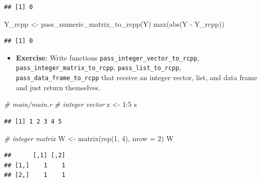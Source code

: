 \documentclass[
]{book}
\newenvironment{Shaded}{\begin{snugshade}}{\end{snugshade}}
\newcommand{\AttributeTok}[1]{\textcolor[rgb]{0.77,0.63,0.00}{#1}}
\newcommand{\CommentTok}[1]{\textcolor[rgb]{0.56,0.35,0.01}{\textit{#1}}}
\newcommand{\DecValTok}[1]{\textcolor[rgb]{0.00,0.00,0.81}{#1}}
\newcommand{\FunctionTok}[1]{\textcolor[rgb]{0.00,0.00,0.00}{#1}}
\newcommand{\NormalTok}[1]{#1}
\newcommand{\OtherTok}[1]{\textcolor[rgb]{0.56,0.35,0.01}{#1}}
\newcommand{\SpecialCharTok}[1]{\textcolor[rgb]{0.00,0.00,0.00}{#1}}
\providecommand{\tightlist}{%
  \setlength{\itemsep}{0pt}\setlength{\parskip}{0pt}}
\begin{document}
\begin{verbatim}
## [1] 0
\end{verbatim}

\begin{Shaded}
\begin{Highlighting}[]
\NormalTok{Y\_rcpp }\OtherTok{\textless{}{-}} \FunctionTok{pass\_numeric\_matrix\_to\_rcpp}\NormalTok{(Y)}
\FunctionTok{max}\NormalTok{(}\FunctionTok{abs}\NormalTok{(Y }\SpecialCharTok{{-}}\NormalTok{ Y\_rcpp))}
\end{Highlighting}
\end{Shaded}

\begin{verbatim}
## [1] 0
\end{verbatim}

\begin{itemize}
\tightlist
\item
  \textbf{Exercise}: Write functions \texttt{pass\_integer\_vector\_to\_rcpp}, \texttt{pass\_integer\_matrix\_to\_rcpp}, \texttt{pass\_list\_to\_rcpp}, \texttt{pass\_data\_frame\_to\_rcpp} that receive an integer vector, list, and data frame and just return themselves.
\end{itemize}

\begin{Shaded}
\begin{Highlighting}[]
\CommentTok{\# main/main.r}
\CommentTok{\# integer vector}
\NormalTok{z }\OtherTok{\textless{}{-}} \DecValTok{1}\SpecialCharTok{:}\DecValTok{5}
\NormalTok{z}
\end{Highlighting}
\end{Shaded}

\begin{verbatim}
## [1] 1 2 3 4 5
\end{verbatim}

\begin{Shaded}
\begin{Highlighting}[]
\CommentTok{\# integer matrix}
\NormalTok{W }\OtherTok{\textless{}{-}} \FunctionTok{matrix}\NormalTok{(}\FunctionTok{rep}\NormalTok{(}\DecValTok{1}\NormalTok{, }\DecValTok{4}\NormalTok{), }\AttributeTok{nrow =} \DecValTok{2}\NormalTok{)}
\NormalTok{W}
\end{Highlighting}
\end{Shaded}

\begin{verbatim}
##      [,1] [,2]
## [1,]    1    1
## [2,]    1    1
\end{verbatim}
\end{document}
